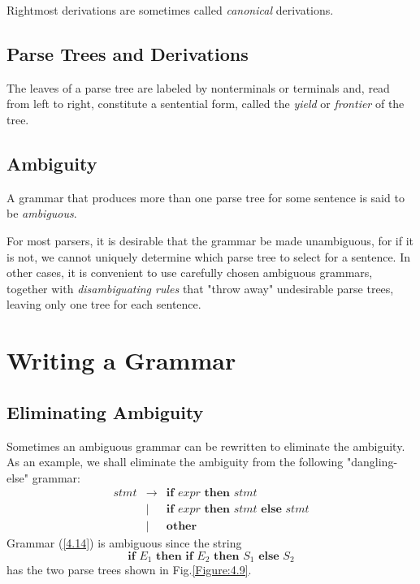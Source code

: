 \documentclass[12pt,a4paper,twoside,openany]{book}
\begin{document}
Rightmost derivations are sometimes called \textit{canonical} derivations.

\subsection{Parse Trees and Derivations}

The leaves of a parse tree are labeled by nonterminals or terminals and, read from left to right, constitute a sentential form, called the \textit{yield} or \textit{frontier} of the tree.

\subsection{Ambiguity}

A grammar that produces more than one parse tree for some sentence is said to be \textit{ambiguous}.

For most parsers, it is desirable that the grammar be made unambiguous, for if it is not, we cannot uniquely determine which parse tree to select for a sentence. In other cases, it is convenient to use carefully chosen ambiguous grammars, together with \textit{disambiguating rules} that "throw away" undesirable parse trees, leaving only one tree for each sentence.

\section{Writing a Grammar}
\subsection{Eliminating Ambiguity}

Sometimes an ambiguous grammar can be rewritten to eliminate the ambiguity. As an example, we shall eliminate the ambiguity from the following "dangling-else" grammar:
\begin{equation}
    \begin{array}{ccl}stmt&\rightarrow&\textbf{if }expr\textbf{ then }stmt\\&|&\textbf{if }expr\textbf{ then }stmt\textbf{ else }stmt\\&|&\textbf{other}\end{array}
    \label{4.14}
\end{equation}
Grammar (\ref{4.14}) is ambiguous since the string
\begin{equation}
    \textbf{if }E_1\textbf{ then if }E_2\textbf{ then }S_1\textbf{ else }S_2
    \label{4.15}
\end{equation}
has the two parse trees shown in Fig.\;\ref{Figure:4.9}.
\end{document}
